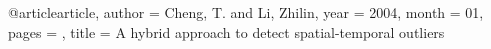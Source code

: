 @article{article,
author = {Cheng, T. and Li, Zhilin},
year = {2004},
month = {01},
pages = {},
title = {A hybrid approach to detect spatial-temporal outliers}
}